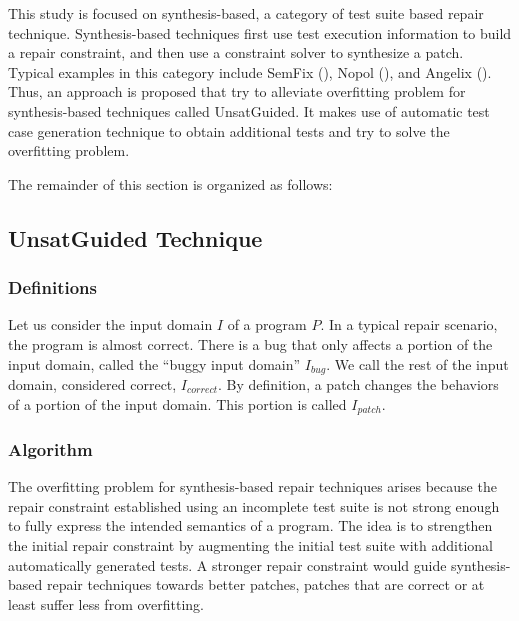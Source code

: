 This study is focused on synthesis-based, a category of test suite based repair technique.
Synthesis-based techniques first use test execution information to build a repair constraint, and then use a constraint solver to synthesize a patch. 
Typical examples in this category include SemFix (\cite{semfix}), Nopol (\cite{nopol}), and Angelix (\cite{Mechtaev:2016:ASM:2884781.2884807}).
Thus, an approach is proposed that try to alleviate overfitting problem for synthesis-based techniques called UnsatGuided.
It makes use of automatic test case generation technique to obtain additional tests and try to solve the overfitting problem.

The remainder of this section is organized as follows:

\subsection{UnsatGuided Technique}
\label{subsec:transversal-contributions:test-for-repair:definitions}

\subsubsection{Definitions}
\label{subsubsec:transversal-contributions:test-for-repair:unsat-guided:definitions}

Let us consider the input domain $I$ of a program $P$.
In a typical repair scenario, the program is almost correct.
There is a bug that only affects a portion of the input domain, called the ``buggy input domain'' $I_{bug}$.
We call the rest of the input domain, considered correct, $I_{correct}$. 
By definition, a patch changes the behaviors of a portion of the input domain.
This portion is called $I_{patch}$.

\subsubsection{Algorithm}
\label{subsubsec:transversal-contributions:test-for-repair:unsat-guided:algo}

The overfitting problem for synthesis-based repair techniques arises because the repair constraint established using an incomplete test suite is not strong enough to fully express the intended semantics of a program.
The idea is to strengthen the initial repair constraint by augmenting the initial test suite with additional automatically generated tests. 
A stronger repair constraint would guide synthesis-based repair techniques towards better patches, \ie patches that are correct or at least suffer less from overfitting.

